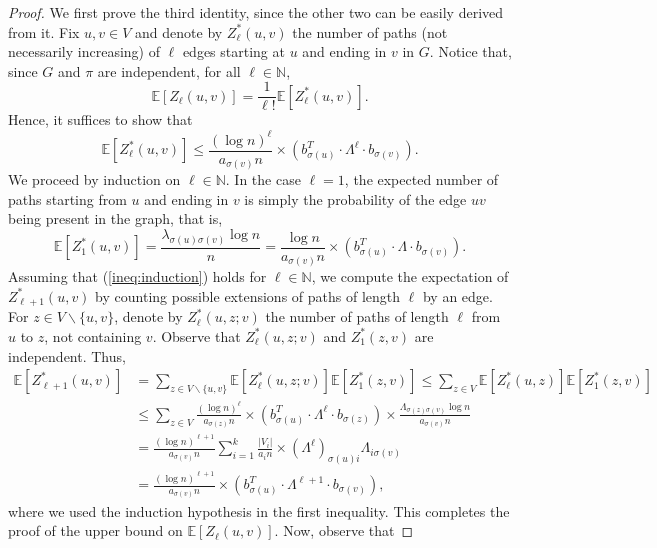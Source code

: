 \documentclass[11pt]{article}
\numberwithin{equation}{section}
\theoremstyle{definition}
\newcommand\bE{{\mathbb E}}
\newcommand\bN{{\mathbb N}}
\begin{document}
\begin{proof}
We first prove the third identity, since the other two can be easily derived from it. Fix $u,v\in V$ and denote by $Z^*_\ell(u,v)$ the number of paths (not necessarily increasing) of $\ell$ edges starting at $u$ and ending in $v$ in $G$. Notice that, since $G$ and $\pi$ are independent, for all $\ell \in \bN$,
$$\bE[Z_\ell(u,v)] = \frac{1}{\ell!} \bE[Z^*_\ell(u,v)]. $$
Hence, it suffices to show that
\begin{equation}
\label{ineq:induction}
\bE[Z^*_\ell(u,v) ]\leq \frac{(\log n)^\ell }{a_{\sigma(v)}n} \times (b_{\sigma(u)}^T \cdot \Lambda^\ell \cdot b_{\sigma(v)}). \end{equation}
We proceed by induction on $\ell \in \bN$. In the case $\ell =1$, the expected number of paths starting from $u$ and ending in $v$ is simply the probability of the edge $uv$ being present in the graph, that is,
$$\bE[Z^*_1(u,v)] = \frac{\lambda_{\sigma(u)\sigma(v)}\log n}{n} = \frac{\log n}{a_{\sigma(v)}n}\times (b^T_{\sigma(u)}\cdot \Lambda\cdot b_{\sigma(v)}). $$
Assuming that (\ref{ineq:induction}) holds for $\ell \in \bN$, we compute the expectation of $Z^*_{\ell+1}(u,v)$ by counting possible extensions of paths of length $\ell$ by an edge. For $z\in V\backslash\{u,v\}$, denote by $Z^*_\ell(u,z;v)$ the number of paths of length $\ell$ from $u$ to $z$, not containing $v$. Observe that $Z^*_{\ell}(u,z;v)$ and $Z^*_1(z,v)$ are independent. Thus,
\begin{equation*}
\begin{split}
    \bE[Z^*_{\ell+1}(u,v)] &= \sum_{z\in V\backslash\{u,v\}}\bE\left[  Z^*_\ell(u,z;v)  \right]\bE[Z^*_1(z,v)] \leq \sum_{z\in V}\bE\left[  Z^*_\ell(u,z)  \right]\bE[Z^*_1(z,v)]\\
    &\leq \sum_{z\in V} \frac{(\log n)^{\ell} }{a_{\sigma(z)}n} \times (b_{\sigma(u)}^T \cdot \Lambda^\ell \cdot b_{\sigma(z)}) \times \frac{ \Lambda_{\sigma(z)\sigma(v)}\log n}{a_{\sigma(v)}n}\\
    &= \frac{(\log n)^{\ell+1}}{a_{\sigma(v)}n} \sum_{i=1}^k \frac{|V_i|}{a_in} \times (\Lambda^\ell)_{\sigma(u)i} \Lambda_{i\sigma(v)} \\
    &= \frac{(\log n)^{\ell+1} }{a_{\sigma(v)}n} \times (b_{\sigma(u)}^T \cdot \Lambda^{\ell+1} \cdot b_{\sigma(v)}), 
\end{split}
\end{equation*}
where we used the induction hypothesis in the first inequality. This completes the proof of the upper bound on $\bE[Z_\ell(u,v)]$. Now, observe that

\end{proof}
\end{document}
